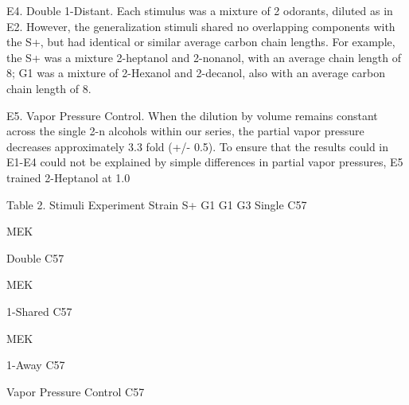 E4. Double 1-Distant. Each stimulus was a mixture of 2 odorants, diluted as in E2. However, the generalization stimuli shared no overlapping components with the S+, but had identical or similar average carbon chain lengths. For example, the S+ was a mixture 2-heptanol and 2-nonanol, with an average chain length of 8; G1 was a mixture of 2-Hexanol and 2-decanol, also with an average carbon chain length of 8.

E5. Vapor Pressure Control. When the dilution by volume remains constant across the single 2-n alcohols within our series, the partial vapor pressure decreases approximately 3.3 fold (+/- 0.5). To ensure that the results could in E1-E4 could not be explained by simple differences in partial vapor pressures, E5 trained 2-Heptanol at 1.0%
 
Table 2. Stimuli
Experiment
Strain
S+
G1
G1
G3
Single
C57
 
 
 
 
 
MEK
 
 
 
 
 
 
 
 
 
 
Double
C57
 
 
 
 
 
MEK
 
 
 
 
 
 
 
 
 
 
1-Shared
C57
 
 
 
 
 
MEK
 
 
 
 
 
 
 
 
 
 
1-Away
C57
 
 
 
 
 
 
 
 
 
 
 
 
 
 
 
 
Vapor Pressure Control
C57
 
 
 
 
 
 
 
 
 
 
 
 
 
 
 
 
